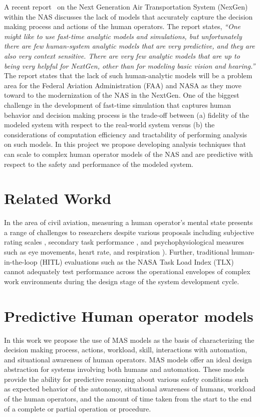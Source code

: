 \documentclass[12pt]{article}
\begin{document}
A recent report~\cite{nrc:nextgen} on the Next Generation Air Transportation System (NexGen) within the NAS discusses the lack of models that accurately capture the decision making process and actions of the human operators. The report states, \emph{``One might like to use fast-time analytic models and simulations, but unfortunately there are few human-system analytic models that are very predictive, and they are also very context sensitive. There are very
few analytic models that are up to being very helpful for NextGen, other than for modeling basic vision and hearing.''} The report states that the lack of such human-analytic models will be a problem area for the Federal Aviation Administration (FAA) and NASA as they move toward to the modernization of the NAS in the NextGen. One of the biggest challenge in the development of fast-time simulation that captures human behavior and decision making process is the trade-off between (a) fidelity of the modeled system with respect to the real-world system versus (b) the considerations of computation efficiency and tractability of performing analysis on such models. In this project we propose developing analysis techniques that can scale to complex human operator models of the NAS and are predictive with respect to the safety and performance of the modeled system. 


\section{Related Workd}

In the area of civil aviation, measuring a human operator's mental
state presents a range of challenges to researchers despite various
proposals including subjective rating scales \cite{NASATLX88},
secondary task performance \cite{DualTaskMethodology91}, and
psychophysiological measures such as eye movements, heart rate, and
respiration \cite{MetricsWorkloadKramer91}).  Further, traditional
hu\-man\--in\--the\--lo\-op (HI\-TL) evaluations such as the NASA Task
Load Index (TLX) cannot adequately test performance across the
operational envelopes of complex work environments during the design
stage of the system development cycle.



\section{Predictive Human operator models} 

In this work we propose the use of MAS models as the basis of
characterizing the decision making process, actions, workload, skill,
interactions with automation, and situational awareness of human
operators.  MAS models offer an ideal design abstraction for systems
involving both humans and automation. These models provide the ability
for predictive reasoning about various safety conditions such as
expected behavior of the autonomy, situational awareness of humans,
workload of the human operators, and the amount of time taken from the
start to the end of a complete or partial operation or procedure.
\end{document}
